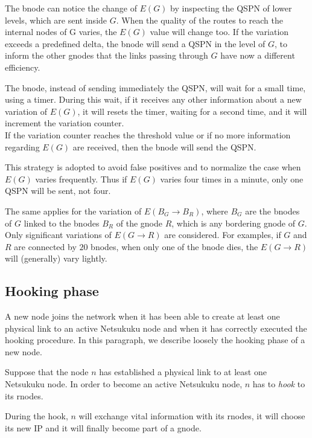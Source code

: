 \documentclass[a4paper]{article}
\begin{document}
The bnode can notice the change of $E(G)$ by inspecting the QSPN of lower
levels, which are sent inside $G$.
When the quality of the routes to reach the internal nodes of G varies, the $E(G)$
value will change too. If the variation exceeds a predefined delta, the bnode
will send a QSPN in the level of $G$, to inform the other gnodes that the links
passing through $G$ have now a different efficiency.

The bnode, instead of sending immediately the QSPN, will wait for a small
time, using a timer. During this wait, if it receives any other information about a
new variation of $E(G)$, it will resets the timer, waiting for a second time,
and it will increment the variation counter.\\
If the variation counter reaches the threshold value or if no more information
regarding $E(G)$ are received, then the bnode will send the QSPN.

This strategy is adopted to avoid false positives and to normalize the case
when $E(G)$ varies frequently. Thus if $E(G)$ varies four times in a minute,
only one QSPN will be sent, not four.

The same applies for the variation of $E(B_G\rightarrow B_R)$, where $B_G$ are
the bnodes of $G$ linked to the bnodes $B_R$ of the gnode $R$, which is any
bordering gnode of $G$. Only significant variations of $E(G\rightarrow R)$ are
considered. For examples, if $G$ and $R$ are connected by $20$ bnodes, when
only one of the bnode dies, the $E(G\rightarrow R)$ will (generally) vary lightly.

\subsection{Hooking phase}
A new node joins the network when it has been able to create at least one
physical link to an active Netsukuku node and when it has correctly executed
the hooking procedure. In this paragraph, we describe loosely the hooking
phase of a new node.

Suppose that the node $n$ has established a physical link to at least one Netsukuku
node. In order to become an active Netsukuku node, $n$ has to \emph{hook} to
its rnodes.

During the hook, $n$ will exchange vital information with its rnodes,
it will choose its new IP and it will finally become part of a gnode.
\end{document}
